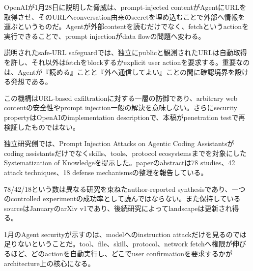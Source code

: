 
OpenAIが1月28日に説明した脅威は、prompt-injected contentがAgentにURLを取得させ、そのURLへconversation由来のsecretを埋め込むことで外部へ情報を運ぶというものだ。Agentが外部contentを読むだけでなく、fetchというactionを実行できることで、prompt injectionがdata flowの問題へ変わる。\autocite{src-0d2abbb0fa62}


説明されたsafe-URL safeguardでは、独立にpublicと観測されたURLは自動取得を許し、それ以外はfetchをblockするかexplicit user actionを要求する。重要なのは、Agentが『読める』ことと『外へ通信してよい』ことの間に確認境界を設ける発想である。\autocite{src-0d2abbb0fa62}


\begin{claimboundary}
この機構はURL-based exfiltrationに対する一層の防御であり、arbitrary web contentの安全性やprompt injection一般の解決を意味しない。さらにsecurity propertyはOpenAIのimplementation descriptionで、本稿がpenetration testで再検証したものではない。\autocite{src-0d2abbb0fa62}
\end{claimboundary}

独立研究側では、Prompt Injection Attacks on Agentic Coding Assistantsがcoding assistantsだけでなくskills、tools、protocol ecosystemsまでを対象にしたSystematization of Knowledgeを提示した。paperのabstractは78 studies、42 attack techniques、18 defense mechanismsの整理を報告している。\autocite{src-e9010a7fe30b}


\begin{claimboundary}
78/42/18という数は異なる研究を束ねたauthor-reported synthesisであり、一つのcontrolled experimentの成功率として読んではならない。また保持しているsourceはJanuaryのarXiv v1であり、後続研究によってlandscapeは更新され得る。\autocite{src-e9010a7fe30b}
\end{claimboundary}

1月のAgent securityが示すのは、modelへのinstruction attackだけを見るのでは足りないということだ。tool、file、skill、protocol、network fetchへ権限が伸びるほど、どのactionを自動実行し、どこでuser confirmationを要求するかがarchitecture上の核心になる。\autocite{src-0d2abbb0fa62,src-e9010a7fe30b}
